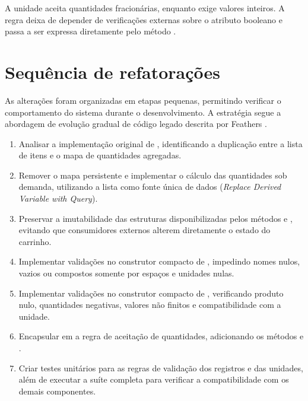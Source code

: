 A unidade  aceita quantidades fracionárias, enquanto  exige valores inteiros. A regra deixa de depender de verificações externas sobre o atributo booleano e passa a ser expressa diretamente pelo método .

\section{Sequência de refatorações}

As alterações foram organizadas em etapas pequenas, permitindo verificar o comportamento do sistema durante o desenvolvimento. A estratégia segue a abordagem de evolução gradual de código legado descrita por Feathers \cite{feathers2013}.

\begin{enumerate}

\item Analisar a implementação original de , identificando a duplicação entre a lista de itens e o mapa de quantidades agregadas.

\item Remover o mapa persistente e implementar o cálculo das quantidades sob demanda, utilizando a lista como fonte única de dados (\textit{Replace Derived Variable with Query}).

\item Preservar a imutabilidade das estruturas disponibilizadas pelos métodos  e , evitando que consumidores externos alterem diretamente o estado do carrinho.

\item Implementar validações no construtor compacto de , impedindo nomes nulos, vazios ou compostos somente por espaços e unidades nulas.

\item Implementar validações no construtor compacto de , verificando produto nulo, quantidades negativas, valores não finitos e compatibilidade com a unidade.

\item Encapsular em  a regra de aceitação de quantidades, adicionando os métodos  e .

\item Criar testes unitários para as regras de validação dos registros e das unidades, além de executar a suíte completa para verificar a compatibilidade com os demais componentes.

\end{enumerate}

